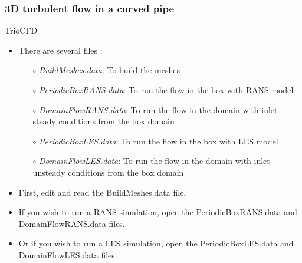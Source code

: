 \documentclass[10pt]{beamer}
\begin{document}
\begin{frame}
\frametitle{3D turbulent flow in a curved pipe}
\begin{block}{TrioCFD}

\begin{itemize}
\item There are several files :\\
    \begin{itemize}
    \item [$\circ$] \textit{BuildMeshes.data}: To build the meshes\\
    \item [$\circ$] \textit{PeriodicBoxRANS.data}: To run the flow in the box with RANS model\\
    \item [$\circ$] \textit{DomainFlowRANS.data}: To run the flow in the domain with inlet steady conditions from the box domain\\
    \item [$\circ$] \textit{PeriodicBoxLES.data}: To run the flow in the box with LES model\\
    \item [$\circ$] \textit{DomainFlowLES.data}: To run the flow in the domain with inlet unsteady conditions from the box domain
    \end{itemize}

\item First, edit and read the BuildMeshes.data file.

\item If you wish to run a RANS simulation, open the PeriodicBoxRANS.data and DomainFlowRANS.data files.

\item Or if you wish to run a LES simulation, open the PeriodicBoxLES.data and DomainFlowLES.data files.
\end{itemize}

\end{block}
\end{frame}
\end{document}

